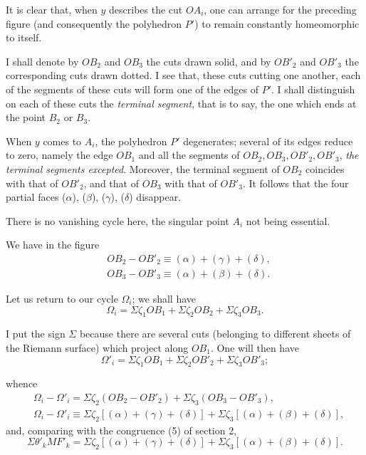 \documentclass{article}
\begin{document}
It is clear that, when $y$ describes the cut $OA_{i}$, one can arrange for the preceding figure (and consequently the polyhedron $P'$) to remain constantly homeomorphic to itself.

I shall denote by $OB_{2}$ and $OB_{3}$ the cuts drawn solid, and by $OB'_{2}$ and $OB'_{3}$ the corresponding cuts drawn dotted. I see that, these cuts cutting one another, each of the segments of these cuts will form one of the edges of $P'$. I shall distinguish on each of these cuts the \emph{terminal segment}, that is to say, the one which ends at the point $B_{2}$ or $B_{3}$.

When $y$ comes to $A_{i}$, the polyhedron $P'$ degenerates; several of its edges reduce to zero, namely the edge $OB_{1}$ and all the segments of $OB_{2}, OB_{3}, OB'_{2}, OB'_{3}$, \emph{the terminal segments excepted}. Moreover, the terminal segment of $OB_{2}$ coincides with that of $OB'_{2}$, and that of $OB_{3}$ with that of $OB'_{3}$. It follows that the four partial faces ($\alpha$), ($\beta$), ($\gamma$), ($\delta$) disappear.

There is no vanishing cycle here, the singular point $A_{i}$ not being essential.

We have in the figure
\[ \begin{aligned} &OB_{2} - OB'_{2} \equiv (\alpha) + (\gamma) + (\delta),\\ &OB_{3} - OB'_{3} \equiv (\alpha) + (\beta) + (\delta). \end{aligned} \]

Let us return to our cycle $\Omega_{i}$; we shall have
\[ \Omega_{i} = \Sigma \zeta_{1} OB_{1} + \Sigma \zeta_{2} OB_{2} + \Sigma \zeta_{3} OB_{3}. \]

I put the sign $\Sigma$ because there are several cuts (belonging to different sheets of the Riemann surface) which project along $OB_{1}$. One will then have
\[ \Omega'_{i} = \Sigma \zeta_{1} OB_{1} + \Sigma \zeta_{2} OB'_{2} + \Sigma \zeta_{3} OB'_{3}; \]

whence
\[ \begin{aligned} &\Omega_{i} - \Omega'_{i} = \Sigma \zeta_{2}(OB_{2} - OB'_{2}) + \Sigma \zeta_{3}(OB_{3} - OB'_{3}),\\ &\Omega_{i} - \Omega'_{i} \equiv \Sigma \zeta_{2}[(\alpha) + (\gamma) + (\delta)] + \Sigma \zeta_{3}[(\alpha) + (\beta) + (\delta)], \end{aligned} \]
and, comparing with the congruence (5) of section 2,
\[ \Sigma \theta'_{k} MF'_{k} = \Sigma \zeta_{2}[(\alpha) + (\gamma) + (\delta)] + \Sigma \zeta_{3}[(\alpha) + (\beta) + (\delta)]. \]
\end{document}
